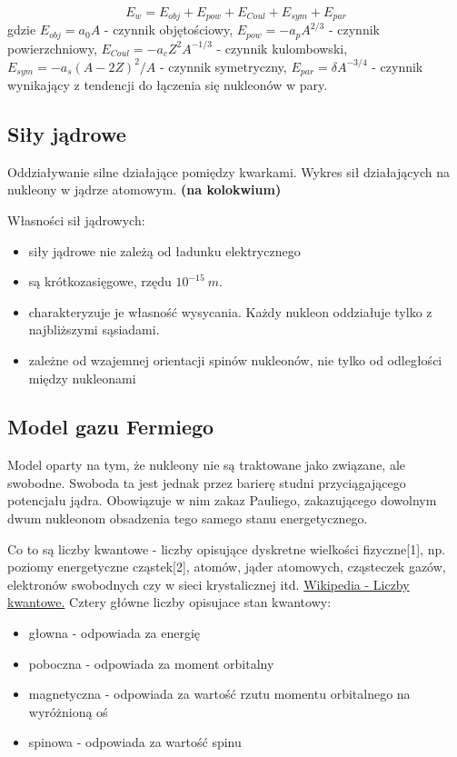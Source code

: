 \documentclass{article}
\begin{document}
\begin{equation}
    E_w = E_{obj} + E_{pow} + E_{Coul} + E_{sym} + E_{par}
\end{equation}
gdzie $E_{obj} = a_0 A$ - czynnik objętościowy, $E_{pow} = -a_p A^{2/3}$ - czynnik powierzchniowy, $E_{Coul} = -a_c Z^2 A^{-1/3}$ - czynnik kulombowski, $E_{sym} = -a_s (A-2Z)^2/A$ - czynnik symetryczny, $E_{par} = \delta A^{-3/4}$ - czynnik wynikający z tendencji do łączenia się nukleonów w pary.

\subsection{Siły jądrowe}
Oddziaływanie silne działające pomiędzy kwarkami.
Wykres sił działających na nukleony w jądrze atomowym. \textbf{(na kolokwium)}

Własności sił jądrowych:
\begin{itemize}
    \item siły jądrowe nie zależą od ładunku elektrycznego
    \item są krótkozasięgowe, rzędu $10^{-15}~m$.
    \item charakteryzuje je własność wysycania. Każdy nukleon oddziałuje tylko z najbliższymi sąsiadami.
    \item zależne od wzajemnej orientacji spinów nukleonów, nie tylko od odległości między nukleonami
\end{itemize}

\subsection{Model gazu Fermiego}
Model oparty na tym, że nukleony nie są traktowane jako związane, ale swobodne. Swoboda ta jest jednak przez barierę studni przyciągającego potencjału jądra. Obowiązuje w nim zakaz Pauliego, zakazującego dowolnym dwum nukleonom obsadzenia tego samego stanu energetycznego.

Co to są liczby kwantowe -  liczby opisujące dyskretne wielkości fizyczne[1], np. poziomy energetyczne cząstek[2], atomów, jąder atomowych, cząsteczek gazów, elektronów swobodnych czy w sieci krystalicznej itd.
\href{https://pl.wikipedia.org/wiki/Liczby_kwantowe}{Wikipedia - Liczby kwantowe.}
Cztery główne liczby opisujace stan kwantowy:
\begin{itemize}
    \item głowna - odpowiada za energię
    \item poboczna - odpowiada za moment orbitalny
    \item magnetyczna - odpowiada za wartość rzutu momentu orbitalnego na wyróżnioną oś
    \item spinowa - odpowiada za wartość spinu
\end{itemize}
\end{document}

